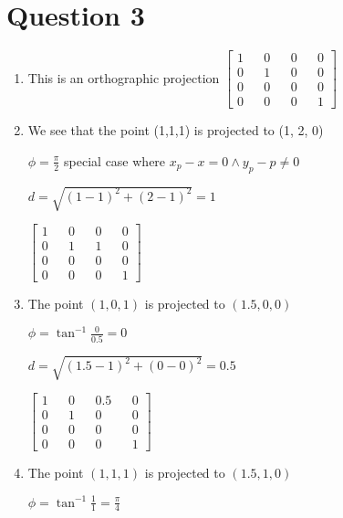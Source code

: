 \documentclass{article}
\begin{document}
    \newpage

    \section*{Question 3}
    \begin{enumerate}
        \item This is an orthographic projection $\begin{bmatrix}
            1 && 0 && 0 && 0 \\ 
            0 && 1 && 0 && 0 \\ 
            0 && 0 && 0 && 0 \\ 
            0 && 0 && 0 && 1 
        \end{bmatrix}$ 

        \item We see that the point (1,1,1) is projected to (1, 2, 0)
        
        $\phi = \frac{\pi}{2}$ special case where $x_p - x = 0 \wedge y_p - p \neq 0$

        $d = \sqrt{(1 - 1)^2 + (2 - 1)^2} = 1$
 
        $\begin{bmatrix}
            1 && 0 && 0 && 0 \\ 
            0 && 1 && 1 && 0 \\ 
            0 && 0 && 0 && 0 \\ 
            0 && 0 && 0 && 1 
        \end{bmatrix}$ 

        \item The point $(1,0,1)$ is projected to $(1.5, 0, 0)$
    
        $\phi = \tan^{-1} \frac{0}{0.5} = 0$

        $d = \sqrt{(1.5 - 1)^2 + (0 - 0)^2} = 0.5$ 

        $\begin{bmatrix}
            1 && 0 && 0.5 && 0 \\ 
            0 && 1 && 0 && 0 \\ 
            0 && 0 && 0 && 0 \\ 
            0 && 0 && 0 && 1 
        \end{bmatrix}$ 
        
        \item The point $(1,1,1)$ is projected to $(1.5, 1, 0)$
        
        $\phi = \tan^{-1} \frac{1}{1} = \frac{\pi}{4}$


\end{enumerate}
\end{document}
